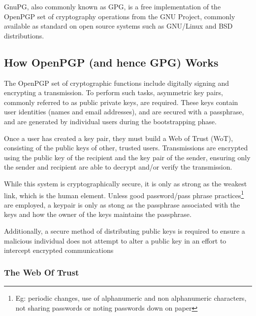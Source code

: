 
GnuPG, also commonly known as GPG, is a free implementation of the
OpenPGP set of cryptography operations from the GNU Project, commonly
available as standard on open source systems such as GNU/Linux and BSD 
distributions.


\subsection{How OpenPGP (and hence GPG) Works}

The OpenPGP set of cryptographic functions include digitally signing and
encrypting a transmission. To perform such tasks, asymmetric key pairs,
commonly referred to as public private keys, are required. These keys
contain user identities (names and email addresses), and are secured 
with a passphrase, and are generated by individual users during the 
bootstrapping phase.


Once a user has created a key pair, they must build a Web of Trust 
(WoT), consisting of the public keys of other, trusted users.
Transmissions are encrypted using the public key of the recipient and
the key pair of the sender, ensuring only the sender and recipient are
able to decrypt and/or verify the transmission.


While this system is cryptographically secure, it is only as strong as
the weakest link, which is the human element. Unless 
good password/pass phrase practices\footnote{Eg: periodic changes, use 
of alphanumeric and non alphanumeric characters, not sharing passwords 
or noting passwords down on paper} are employed, a keypair is only as 
stong as the passphrase associated with the keys and how the owner of 
the keys maintains the passphrase.


Additionally, a secure method of distributing public keys is required to
ensure a malicious individual does not attempt to alter a public key in
an effort to intercept encrypted communications

\subsubsection{The Web Of Trust}

